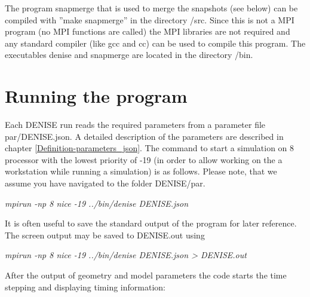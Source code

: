 The program snapmerge that is used to merge the snapshots (see below) can be compiled with ''make snapmerge'' in the directory /src. Since this is not a MPI program (no MPI functions are called) the MPI libraries are not required and any standard compiler (like gcc and cc) can be used to compile this program. The executables denise and snapmerge are located in the directory /bin. 

\section{Running the program}\label{compexec1} 
Each DENISE run reads the required parameters from a parameter file par/DENISE.json. A detailed description of the parameters are described in chapter \ref{Definition-parameters_json}. 
The command to start a simulation on 8 processor with the lowest priority of -19 (in order to allow working on the a workstation while running a simulation) is as follows. Please note, that we assume you have navigated to the folder DENISE/par.
\newline

\textit{mpirun -np 8 nice -19 ../bin/denise DENISE.json }
\newline


It is often useful to save the standard output of the program for later reference. The screen output may be saved to DENISE.out using
\newline

\textit{mpirun -np 8 nice -19 ../bin/denise DENISE.json > DENISE.out}
\newline


\newpage

After the output of geometry and model parameters the code starts the time stepping and displaying timing information:

